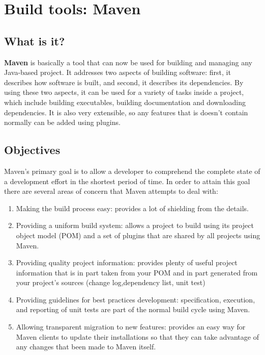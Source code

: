 \section{Build tools: Maven}

\subsection{What is it?}

\begin{flushleft}
\textbf{Maven} is basically a tool that can now be used for building and managing any Java-based project. It addresses two aspects of building software: first, it describes how software is built, and second, it describes its dependencies. By using these two aspects, it can be used for a variety of tasks inside a project, which include building executables, building documentation and downloading dependencies. It is also very extensible, so any features that is doesn't contain normally can be added using plugins. 

\end{flushleft}


\subsection{Objectives}

Maven’s primary goal is to allow a developer to comprehend the complete state of a development effort in the shortest period of time. In order to attain this goal there are several areas of concern that Maven attempts to deal with: 

\begin{enumerate}
\item Making the build process easy: provides a lot of shielding from the details.

\item Providing a uniform build system: allows a project to build using its project object model (POM) and a set of plugins that are shared by all projects using Maven.

\item Providing quality project information: provides plenty of useful project information that is in part taken from your POM and in part generated from your project’s sources (change log,dependency list, unit test)

\item Providing guidelines for best practices development: specification, execution, and reporting of unit tests are part of the normal build cycle using Maven.

\item Allowing transparent migration to new features: provides an easy way for Maven clients to update their installations so that they can take advantage of any changes that been made to Maven itself.

\end{enumerate}

